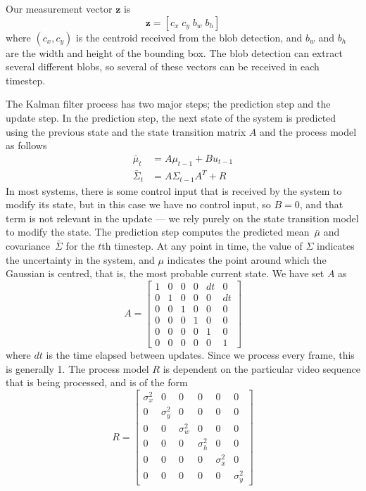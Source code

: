 \documentclass[conference]{IEEEtran}
\begin{document}
Our measurement vector $\mathbf{z}$ is
\begin{equation}
  \label{eq:measvec}
  \mathbf{z}=\left[c_x\;c_y\;b_w\;b_h\right]
\end{equation}
where $(c_x,c_y)$ is the centroid received from the blob detection, and $b_w$ and
$b_h$ are the width and height of the bounding box. The blob detection can extract
several different blobs, so several of these vectors can be received in each timestep.

The Kalman filter process has two major steps; the prediction step and
the update step.  In the prediction step, the next state of the system is
predicted using the previous state and the state transition matrix $A$ and the
process model as follows
\begin{align}
  \bar{\mu}_t&=A\mu_{t-1}+Bu_{t-1}\\
  \bar{\Sigma}_t&=A\Sigma_{t-1}A^T+R
\end{align}
In most systems, there is some control input that is received by the system to
modify its state, but in this case we have no control input, so $B=0$, and that
term is not relevant in the update --- we rely purely on the state transition
model to modify the state. The prediction step computes the predicted
mean~$\bar{\mu}$ and covariance~$\bar{\Sigma}$ for the $t$th timestep. At any
point in time, the value of $\Sigma$ indicates the uncertainty in the system,
and $\mu$ indicates the point around which the Gaussian is centred, that is,
the most probable current state. We have set $A$ as
\begin{equation}
  \label{eq:amat}
  A=\begin{bmatrix}
    1&0&0&0&dt&0\\
    0&1&0&0&0&dt\\
    0&0&1&0&0&0\\
    0&0&0&1&0&0\\
    0&0&0&0&1&0\\
    0&0&0&0&0&1
  \end{bmatrix}
\end{equation}
where $dt$ is the time elapsed between updates. Since we process every frame,
this is generally 1. The process model $R$ is dependent on the particular video
sequence that is being processed, and is of the form
\begin{equation}
  \label{eq:rmat}
  R=\begin{bmatrix}
    \sigma_x^2&0&0&0&0&0\\
    0&\sigma_y^2&0&0&0&0\\
    0&0&\sigma_w^2&0&0&0\\
    0&0&0&\sigma_h^2&0&0\\
    0&0&0&0&\sigma_{\dot{x}}^2&0\\
    0&0&0&0&0&\sigma_{\dot{y}}^2
  \end{bmatrix}
\end{equation}
\end{document}
